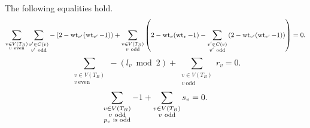  \begin{lemma}\label{breakupeq} The following equalities hold.
  \[ \sum_{\substack{v \in V(T_B) \\ v \ \mathrm{even}}} \sum_{\substack{v' \in C(v) \\ v' \ \mathrm{odd}}} -\left( 2-  \wt_{v'}(\wt_{v'}-1)  \right)  + \sum_{\substack{v \in V(T_B) \\ v \ \mathrm{odd}}} \left( 2 -  \wt_v(\wt_v-1)  - \sum_{\substack{v' \in C(v) \\ v' \ \mathrm{odd}}} \left( 2-  \wt_{v'}(\wt_{v'}-1) \right) \right)  = 0 .\]
  \[ \sum_{\substack{v \in V(T_B) \\ v \ \mathrm{even}}} -(l_v \bmod 2) + \sum_{\substack{v \in V(T_B) \\ v \ \mathrm{odd}}} r_v = 0  .\]
  \[ \sum_{\substack{v \in V(T_B) \\ v \ \mathrm{odd} \\ \textup{$p_v$ is odd}}} -1 + \sum_{\substack{v \in V(T_B) \\ v \ \mathrm{odd}}} s_v = 0  .\] 
 \end{lemma}

